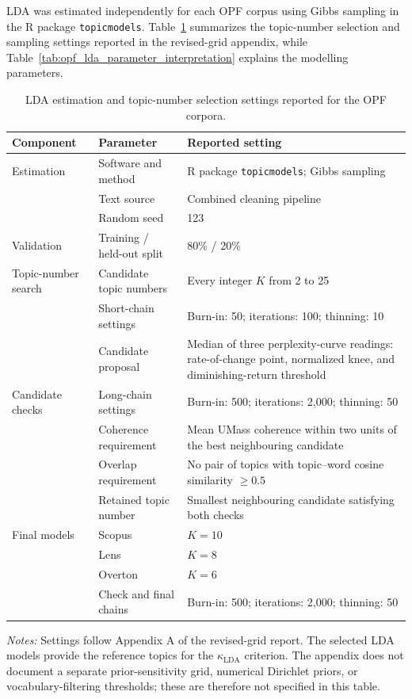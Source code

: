\documentclass[a4paper,fleqn]{cas-sc}
\begin{document}
LDA was estimated independently for each OPF corpus using Gibbs sampling in the R package \texttt{topicmodels}. Table~\ref{tab:opf_lda_parameters} summarizes the topic-number selection and sampling settings reported in the revised-grid appendix, while Table~\ref{tab:opf_lda_parameter_interpretation} explains the modelling parameters.

\begin{table}[htbp]
\centering
\caption{LDA estimation and topic-number selection settings reported for the OPF corpora.}
\label{tab:opf_lda_parameters}
\scriptsize
\setlength{\tabcolsep}{4pt}
\renewcommand{\arraystretch}{1.15}
\begin{tabularx}{\textwidth}{p{30mm}p{39mm}X}
\toprule
Component & Parameter & Reported setting \\
\midrule
Estimation & Software and method & R package \texttt{topicmodels}; Gibbs sampling \\
& Text source & Combined cleaning pipeline \\
& Random seed & 123 \\
\midrule
Validation & Training / held-out split & 80\% / 20\% \\
Topic-number search & Candidate topic numbers & Every integer $K$ from 2 to 25 \\
& Short-chain settings & Burn-in: 50; iterations: 100; thinning: 10 \\
& Candidate proposal & Median of three perplexity-curve readings: rate-of-change point, normalized knee, and diminishing-return threshold \\
\midrule
Candidate checks & Long-chain settings & Burn-in: 500; iterations: 2,000; thinning: 50 \\
& Coherence requirement & Mean UMass coherence within two units of the best neighbouring candidate \\
& Overlap requirement & No pair of topics with topic--word cosine similarity $\geq0.5$ \\
& Retained topic number & Smallest neighbouring candidate satisfying both checks \\
\midrule
Final models & Scopus & $K=10$ \\
& Lens & $K=8$ \\
& Overton & $K=6$ \\
& Check and final chains & Burn-in: 500; iterations: 2,000; thinning: 50 \\
\bottomrule
\end{tabularx}
\vspace{2mm}
\begin{minipage}{\textwidth}
\footnotesize
\textit{Notes:} Settings follow Appendix A of the revised-grid report. The selected LDA models provide the reference topics for the $\kappa_{\mathrm{LDA}}$ criterion. The appendix does not document a separate prior-sensitivity grid, numerical Dirichlet priors, or vocabulary-filtering thresholds; these are therefore not specified in this table.
\end{minipage}
\end{table}
\end{document}
